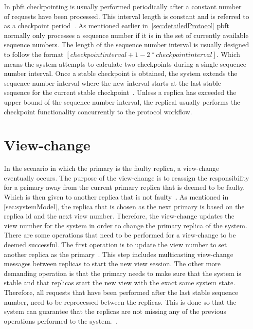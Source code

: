 In \ac{pbft} checkpointing is usually performed periodically after a constant number of requests have been processed. This interval length is constant and is referred to as a checkpoint period~\cites[p.~261]{BOOK:BuildDepDistSyst}[p.~410]{PAPER:PBFTRecovery}. As mentioned earlier in~\autoref{sec:detailedProtocol} \ac{pbft} normally only processes a sequence number if it is in the set of currently available sequence numbers. The length of the sequence number interval is usually designed to follow the format $[checkpointinterval+1-2*checkpointinterval]$. Which means the system attempts to calculate two checkpoints during a single sequence number interval. Once a stable checkpoint is obtained, the system extends the sequence number interval where the new interval starts at the last stable sequence for the current stable checkpoint~\cites[p.~5]{PAPER:OGPBFT}[p.~410]{PAPER:PBFTRecovery}. Unless a replica has exceeded the upper bound of the sequence number interval, the replical usually performs the checkpoint functionality concurrently to the protocol workflow.

\section{View-change}
\label{sec:view-change}
In the scenario in which the primary is the faulty replica, a view-change eventually occurs. The purpose of the view-change is to reassign the responsibility for a primary away from the current primary replica that is deemed to be faulty. Which is then given to another replica that is not faulty~\cites[p.262]{BOOK:BuildDepDistSyst}. As mentioned in \autoref{sec:systemModel}, the replica that is chosen as the next primary is based on the replica id and the next view number. Therefore, the view-change updates the view number for the system in order to change the primary replica of the system. There are some operations that need to be performed for a view-change to be deemed successful. The first operation is to update the view number to set another replica as the primary~\cites[p.~6]{PAPER:OGPBFT}[p.~411]{PAPER:PBFTRecovery}{WEB:SawtoothPBFT}. This step includes multicasting view-change messages between replicas to start the new view session. The other more demanding operation is that the primary needs to make sure that the system is stable and that replicas start the new view with the exact same system state. Therefore, all requests that have been performed after the last stable sequence number, need to be reprocessed between the replicas. This is done so that the system can guarantee that the replicas are not missing any of the previous operations performed to the system.~\cites[p.~458]{BOOK:MVstandver3}[p.~263-265]{BOOK:BuildDepDistSyst}.

